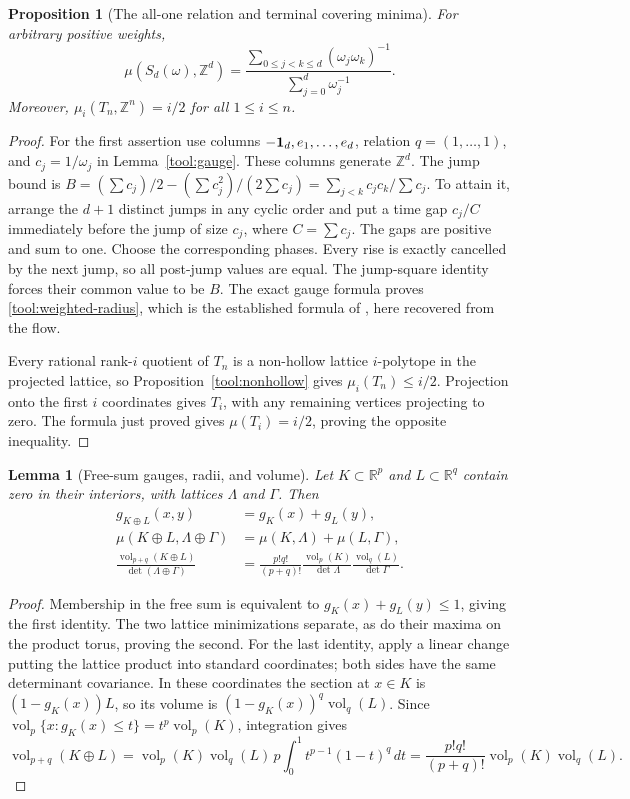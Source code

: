 \documentclass[11pt,a4paper]{article}
\newtheorem{lemma}[theorem]{Lemma}
\newtheorem{proposition}[theorem]{Proposition}
\theoremstyle{remark}\newtheorem{remark}[theorem]{Remark}
\DeclareMathOperator{\vol}{vol}
\newcommand{\R}{\mathbb R}\newcommand{\Z}{\mathbb Z}\newcommand{\Q}{\mathbb Q}
\begin{document}
\begin{proposition}[The all-one relation and terminal covering minima]
\label{tool:terminal}
For arbitrary positive weights,
\begin{equation}\label{tool:weighted-radius}
 \mu(S_d(\omega),\Z^d)=
 \frac{\sum_{0\le j<k\le d}(\omega_j\omega_k)^{-1}}
      {\sum_{j=0}^d\omega_j^{-1}}.
\end{equation}
Moreover, $\mu_i(T_n,\Z^n)=i/2$ for all $1\le i\le n$.
\end{proposition}
\begin{proof}
For the first assertion use columns $-\mathbf1_d,e_1,\ldots,e_d$,
relation $q=(1,\ldots,1)$, and $c_j=1/\omega_j$ in
Lemma~\ref{tool:gauge}. These columns generate $\Z^d$.
The jump bound is
$B=(\sum c_j)/2-(\sum c_j^2)/(2\sum c_j)
=\sum_{j<k}c_jc_k/\sum c_j$.
To attain it, arrange the $d+1$ distinct jumps in any cyclic order
and put a time gap $c_j/C$ immediately before the jump of size $c_j$,
where $C=\sum c_j$. The gaps are positive and sum to one.
Choose the corresponding phases. Every rise is exactly cancelled
by the next jump, so all post-jump values are equal. The jump-square
identity forces their common value to be $B$. The exact gauge
formula proves \eqref{tool:weighted-radius}, which is the established
formula of \cite[Theorem 1.4]{CSS}, here recovered from the flow.

Every rational rank-$i$ quotient of $T_n$ is a non-hollow lattice
$i$-polytope in the projected lattice, so
Proposition~\ref{tool:nonhollow} gives $\mu_i(T_n)\le i/2$.
Projection onto the first $i$ coordinates gives $T_i$, with any
remaining vertices projecting to zero. The formula just proved
gives $\mu(T_i)=i/2$, proving the opposite inequality.
\end{proof}

\begin{lemma}[Free-sum gauges, radii, and volume]
\label{tool:freesum}
Let $K\subset\R^p$ and $L\subset\R^q$ contain zero in their
interiors, with lattices $\Lambda$ and $\Gamma$. Then
\begin{align*}
 g_{K\oplus L}(x,y)&=g_K(x)+g_L(y),\\
 \mu(K\oplus L,\Lambda\oplus\Gamma)
 &=\mu(K,\Lambda)+\mu(L,\Gamma),\\
 \frac{\vol_{p+q}(K\oplus L)}{\det(\Lambda\oplus\Gamma)}
 &=\frac{p!q!}{(p+q)!}
   \frac{\vol_p(K)}{\det\Lambda}
   \frac{\vol_q(L)}{\det\Gamma}.
\end{align*}
\end{lemma}
\begin{proof}
Membership in the free sum is equivalent to
$g_K(x)+g_L(y)\le1$, giving the first identity.
The two lattice minimizations separate, as do their maxima on the
product torus, proving the second. For the last identity, apply a
linear change putting the lattice product into standard coordinates;
both sides have the same determinant covariance. In these coordinates
the section at $x\in K$ is $(1-g_K(x))L$, so its volume is
$(1-g_K(x))^q\vol_q(L)$. Since
$\vol_p\{x:g_K(x)\le t\}=t^p\vol_p(K)$, integration gives
\[
 \vol_{p+q}(K\oplus L)
 =\vol_p(K)\vol_q(L)\,p\int_0^1t^{p-1}(1-t)^q\,dt
 =\frac{p!q!}{(p+q)!}\vol_p(K)\vol_q(L).
\]
\end{proof}
\end{document}
